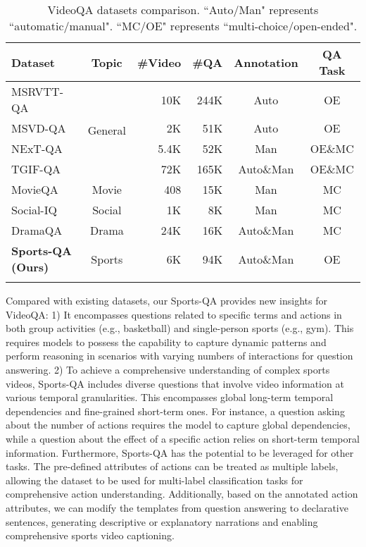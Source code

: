{\begin{table}[tbp]
\caption{VideoQA datasets comparison. ``Auto/Man" represents ``automatic/manual". ``MC/OE" represents ``multi-choice/open-ended".}
\label{set}
\begin{tabular}{@{}lcrrcc@{}}
\toprule
Dataset                           & Topic   & \multicolumn{1}{c}{\#Video} & \multicolumn{1}{c}{\#QA} & Annotation  & QA Task  \\ \midrule
MSRVTT-QA \citep{xu2017video}      & \multirow{4}{*}{General} & 10K                         & 244K                     & Auto        & OE       \\
MSVD-QA \citep{xu2017video}        &  & 2K                          & 51K                      & Auto        & OE       \\
NExT-QA \citep{xiao2021next}       &  & 5.4K                        & 52K                      & Man         & OE\&MC \\
TGIF-QA \citep{jang2017tgif}       &  & 72K                         & 165K                     & Auto\&Man & OE\&MC \\ \midrule
MovieQA \citep{tapaswi2016movieqa} & Movie   & 408                         & 15K                      & Man         & MC       \\
Social-IQ \citep{zadeh2019social}  & Social  & 1K                          & 8K                       & Man         & MC       \\
DramaQA \citep{choi2021dramaqa}    & Drama   & 24K                         & 16K                      & Auto\&Man & MC       \\
\textbf{Sports-QA (Ours)}                  & Sports  & 6K                          & 94K                      & Auto\&Man & OE       \\ \botrule
\end{tabular}
\end{table}


Compared with existing datasets, our Sports-QA provides new insights for VideoQA: 1) It encompasses questions related to specific terms and actions in both group activities (e.g., basketball) and single-person sports (e.g., gym). This requires models to possess the capability to capture dynamic patterns and perform reasoning in scenarios with varying numbers of interactions for question answering. 2) To achieve a comprehensive understanding of complex sports videos, Sports-QA includes diverse questions that involve video information at various temporal granularities. This encompasses global long-term temporal dependencies and fine-grained short-term ones. For instance, a question asking about the number of actions requires the model to capture global dependencies, while a question about the effect of a specific action relies on short-term temporal information. Furthermore, Sports-QA has the potential to be leveraged for other tasks. The pre-defined attributes of actions can be treated as multiple labels, allowing the dataset to be used for multi-label classification tasks for comprehensive action understanding. Additionally, based on the annotated action attributes, we can modify the templates from question answering to declarative sentences, generating descriptive or explanatory narrations and enabling comprehensive sports video captioning.


}
